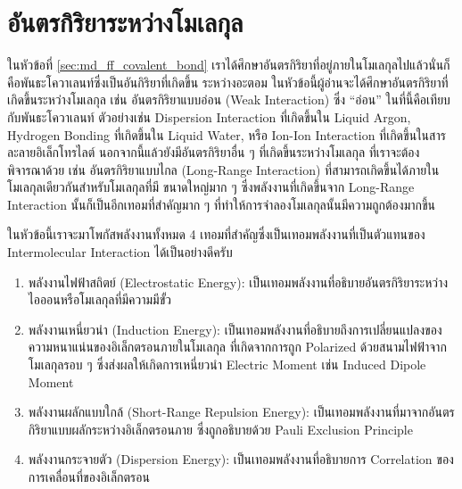 \section{อันตรกิริยาระหว่างโมเลกุล}

ในหัวข้อที่ \ref{sec:md_ff_covalent_bond} เราได้ศึกษาอันตรกิริยาที่อยู่ภายในโมเลกุลไปแล้วนั่นก็คือพันธะโควาเลนท์ซึ่งเป็นอันกิริยาที่เกิดขึ้น%
ระหว่างอะตอม ในหัวข้อนี้ผู้อ่านจะได้ศึกษาอันตรกิริยาที่เกิดขึ้นระหว่างโมเลกุล เช่น อันตรกิริยาแบบอ่อน (Weak Interaction) ซึ่ง \enquote{อ่อน} 
ในที่นี้คือเทียบกับพันธะโควาเลนท์ ตัวอย่างเช่น Dispersion Interaction ที่เกิดขึ้นใน Liquid Argon, Hydrogen Bonding ที่เกิดขึ้นใน 
Liquid Water, หรือ Ion-Ion Interaction ที่เกิดขึ้นในสารละลายอิเล็กโทรไลต์ นอกจากนี้แล้วยังมีอันตรกิริยาอื่น ๆ ที่เกิดขึ้นระหว่างโมเลกุล%
ที่เราจะต้องพิจารณาด้วย เช่น อันตรกิริยาแบบไกล (Long-Range Interaction) ที่สามารถเกิดขึ้นได้ภายในโมเลกุลเดียวกันสำหรับโมเลกุลที่มี%
ขนาดใหญ่มาก ๆ ซึ่งพลังงานที่เกิดขึ้นจาก Long-Range Interaction นั้นก็เป็นอีกเทอมที่สำคัญมาก ๆ ที่ทำให้การจำลองโมเลกุลนั้นมีความถูกต้องมากขึ้น 

ในหัวข้อนี้เราจะมาโพกัสพลังงานทั้งหมด 4 เทอมที่สำคัญซึ่งเป็นเทอมพลังงานที่เป็นตัวแทนของ Intermolecular Interaction ได้เป็นอย่างดีครับ

\begin{enumerate}[topsep=0pt,noitemsep]
    \setlength\itemsep{1em}
    \item พลังงานไฟฟ้าสถิตย์ (Electrostatic Energy): เป็นเทอมพลังงานที่อธิบายอันตรกิริยาระหว่างไอออนหรือโมเลกุลที่มีความมีขั้ว
    
    \item พลังงานเหนี่ยวนำ (Induction Energy): เป็นเทอมพลังงานที่อธิบายถึงการเปลี่ยนแปลงของความหนาแน่นของอิเล็กตรอนภายในโมเลกุล%
    ที่เกิดจากการถูก Polarized ด้วยสนามไฟฟ้าจากโมเลกุลรอบ ๆ ซึ่งส่งผลให้เกิดการเหนี่ยวนำ Electric Moment เช่น Induced Dipole 
    Moment 
    
    \item พลังงานผลักแบบใกล้ (Short-Range Repulsion Energy): เป็นเทอมพลังงานที่มาจากอันตรกิริยาแบบผลักระหว่างอิเล็กตรอนภาย%
    ซึ่งถูกอธิบายด้วย Pauli Exclusion Principle

    \item พลังงานกระจายตัว (Dispersion Energy): เป็นเทอมพลังงานที่อธิบายการ Correlation ของการเคลื่อนที่ของอิเล็กตรอน
\end{enumerate}

